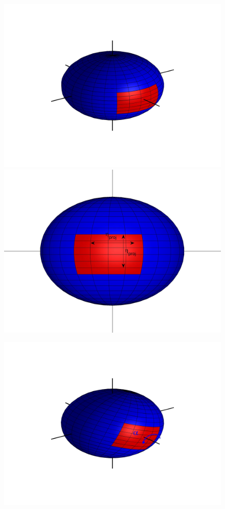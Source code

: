 \documentclass[12pt]{article}
\begin{document}
\begin{figure}[H]
\begin{minipage}{0.2\textwidth}
\centering
\includegraphics[width=\textwidth]{sphere_1}\\
\includegraphics[width=\textwidth]{sphere2_1}\\
\end{minipage}
%
\begin{minipage}{0.2\textwidth}
\centering
\includegraphics[width=\textwidth]{sphere_2}\\

\end{minipage}
\end{figure}
\end{document}
